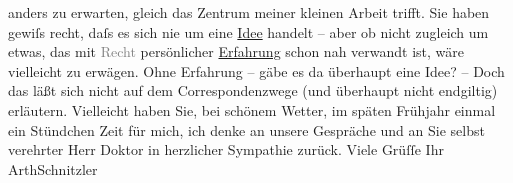                anders zu erwarten, gleich das Zentrum meiner kleinen Arbeit trifft. Sie haben gewiſs recht, daſs es sich nie um
               eine \uline{Idee} handelt – aber ob nicht zugleich um etwas,
               das mit \textcolor{gray}{Recht} persönlicher \uline{Erfahrung} schon nah verwandt ist, wäre vielleicht zu erwägen. Ohne Erfahrung
               – gäbe es da{\geminationn} überhaupt eine Idee? – Doch das läßt {\pb}sich nicht auf dem Correspondenzwege (und überhaupt nicht
               endgiltig) erläutern. Vielleicht haben Sie, bei schönem Wetter, im späten Frühjahr
               einmal ein Stündchen Zeit für mich, ich denke an unsere Gespräche und an Sie selbst
               verehrter Herr Doktor in herzlicher Sympathie zurück.\pend
           \pstart Viele Grüſſe Ihr \spacefill\mbox{ArthSchnitzler}\pend{}\endnumbering{}  \newcommand{\dateiname}{L02484}\newcommand{\titel}{Arthur Schnitzler an Robert Adam, 9. 4. 1927}\newcommand{\editorInnen}{Martin Anton Müller und Gerd-Hermann Susen}
